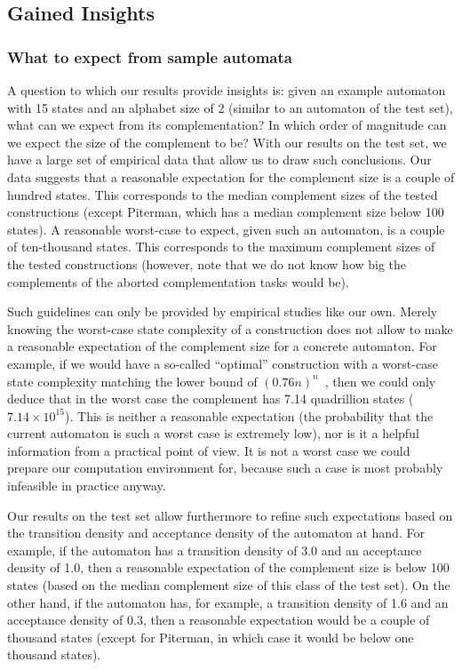 \subsection{Gained Insights}
\label{5_insights}

\subsubsection{What to expect from sample automata}
A question to which our results provide insights is: given an example automaton with 15 states and an alphabet size of 2 (similar to an automaton of the \goal{} test set), what can we expect from its complementation? In which order of magnitude can we expect the size of the complement to be? With our results on the \goal{} test set, we have a large set of empirical data that allow us to draw such conclusions. Our data suggests that a reasonable expectation for the complement size is a couple of hundred states. This corresponds to the median complement sizes of the tested constructions (except Piterman, which has a median complement size below 100 states). A reasonable worst-case to expect, given such an automaton, is a couple of ten-thousand states. This corresponds to the maximum complement sizes of the tested constructions (however, note that we do not know how big the complements of the aborted complementation tasks would be).

Such guidelines can only be provided by empirical studies like our own. Merely knowing the worst-case state complexity of a construction does not allow to make a reasonable expectation of the complement size for a concrete automaton. For example, if we would have a so-called ``optimal'' construction with a worst-case state complexity matching the lower bound of $(0.76n)^n$~\cite{DBLP:journals/corr/abs-0802-1226}, then we could only deduce that in the worst case the complement has 7.14 quadrillion states ($7.14 \times 10^{15}$). This is neither a reasonable expectation (the probability that the current automaton is such a worst case is extremely low), nor is it a helpful information from a practical point of view. It is not a worst case we could prepare our computation environment for, because such a case is most probably infeasible in practice anyway.  

Our results on the \goal{} test set allow furthermore to refine such expectations based on the transition density and acceptance density of the automaton at hand. For example, if the automaton has a transition density of 3.0 and an acceptance density of 1.0, then a reasonable expectation of the complement size is below 100 states (based on the median complement size of this class of the \goal{} test set). On the other hand, if the automaton has, for example, a transition density of 1.6 and an acceptance density of 0.3, then a reasonable expectation would be a couple of thousand states (except for Piterman, in which case it would be below one thousand states).

